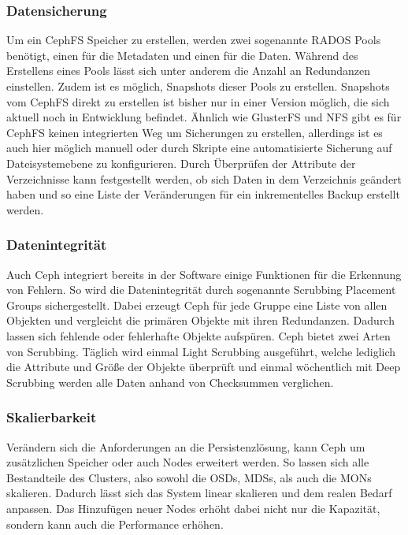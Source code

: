 \subsubsection{Datensicherung}
Um ein CephFS Speicher zu erstellen, werden zwei sogenannte RADOS Pools benötigt, einen für die Metadaten und einen für die Daten. Während des Erstellens eines Pools lässt sich unter anderem die Anzahl an Redundanzen einstellen. Zudem ist es möglich, Snapshots dieser Pools zu erstellen. Snapshots vom CephFS direkt zu erstellen ist bisher nur in einer Version möglich, die sich aktuell noch in Entwicklung befindet.
Ähnlich wie GlusterFS und \ac{NFS} gibt es für CephFS keinen integrierten Weg um Sicherungen zu erstellen, allerdings ist es auch hier möglich manuell oder durch Skripte eine automatisierte Sicherung auf Dateisystemebene zu konfigurieren. Durch Überprüfen der Attribute der Verzeichnisse kann festgestellt werden, ob sich Daten in dem Verzeichnis geändert haben und so eine Liste der Veränderungen für ein inkrementelles Backup erstellt werden.

\subsubsection{Datenintegrität}
Auch Ceph integriert bereits in der Software einige Funktionen für die Erkennung von Fehlern. So wird die Datenintegrität durch sogenannte Scrubbing Placement Groups sichergestellt. Dabei erzeugt Ceph für jede Gruppe eine Liste von allen Objekten und vergleicht die primären Objekte mit ihren Redundanzen. Dadurch lassen sich fehlende oder fehlerhafte Objekte aufspüren. Ceph bietet zwei Arten von Scrubbing. Täglich wird einmal Light Scrubbing ausgeführt, welche lediglich die Attribute und Größe der Objekte überprüft und einmal wöchentlich mit Deep Scrubbing werden alle Daten anhand von Checksummen verglichen.

\subsubsection{Skalierbarkeit}
Verändern sich die Anforderungen an die Persistenzlösung, kann Ceph um zusätzlichen Speicher oder auch Nodes erweitert werden. So lassen sich alle Bestandteile des Clusters, also sowohl die OSDs, MDSs, als auch die MONs skalieren. Dadurch lässt sich das System linear skalieren und dem realen Bedarf anpassen. Das Hinzufügen neuer Nodes erhöht dabei nicht nur die Kapazität, sondern kann auch die Performance erhöhen.

